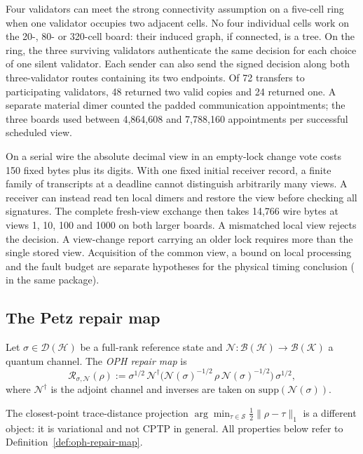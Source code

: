 Four validators can meet the strong connectivity assumption on a five-cell
ring when one validator occupies two adjacent cells. No four individual cells
work on the 20-, 80- or 320-cell board: their induced graph, if connected, is
a tree. On the ring, the three surviving validators authenticate the same
decision for each choice of one silent validator. Each sender can also send
the signed decision along both three-validator routes containing its two
endpoints. Of 72 transfers to participating validators, 48 returned two
valid copies and 24 returned one. A separate material dimer counted the
padded communication appointments; the three boards used between
4,864,608 and 7,788,160 appointments per successful scheduled view.

On a serial wire the absolute decimal view in an empty-lock change vote
costs 150 fixed bytes plus its digits. With one fixed initial receiver
record, a finite family of transcripts at a deadline cannot distinguish
arbitrarily many views. A receiver can instead read ten local dimers and
restore the view before checking all signatures. The complete fresh-view
exchange then takes 14,766 wire bytes at views 1, 10, 100 and 1000 on
both larger boards. A mismatched local view rejects the decision. A
view-change report carrying an older lock requires more than the single
stored view. Acquisition of the common view, a bound on local processing
and the fault budget are separate hypotheses for the physical timing
conclusion ( in the same package).

\subsection*{The Petz repair map}

\begin{definition}
\label{def:oph-repair-map}
Let $\sigma\in\mathcal{D}(\mathcal{H})$ be a full-rank reference state and
$\mathcal{N}:\mathcal{B}(\mathcal{H})\to\mathcal{B}(\mathcal{K})$ a quantum channel.
The \emph{OPH repair map} is
\[
  \mathcal{R}_{\sigma,\mathcal{N}}(\rho)
  := \sigma^{1/2}\,
     \mathcal{N}^\dagger\!\bigl(
       \mathcal{N}(\sigma)^{-1/2}\,\rho\,\mathcal{N}(\sigma)^{-1/2}
     \bigr)
     \,\sigma^{1/2},
\]
where $\mathcal{N}^\dagger$ is the adjoint channel and inverses are
taken on $\mathrm{supp}(\mathcal{N}(\sigma))$.
\end{definition}

The closest-point trace-distance projection
\(\arg\min_{\tau\in\mathcal S}\tfrac12\|\rho-\tau\|_1\) is a different object:
it is variational and not CPTP in general. All properties below refer to
Definition~\ref{def:oph-repair-map}.

